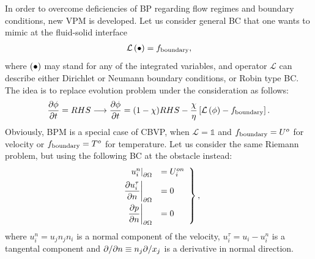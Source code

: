 In order to overcome deficiencies of BP regarding flow regimes and boundary conditions, new VPM is developed. Let us consider general BC that one wants to mimic at the fluid-solid interface
\begin{align}
\mathcal L \left(\bullet\right) = f_{\textmd{boundary}},
\end{align}
where $\left(\bullet\right)$ may stand for any of the integrated variables, and operator $\mathcal L$ can describe either Dirichlet or Neumann boundary conditions, or Robin type BC. The idea is to replace evolution problem under the consideration as follows:
\begin{align}
\frac {\partial \phi}{\partial t} = RHS \longrightarrow \frac {\partial \phi}{\partial t} = (1-\chi)RHS - \frac \chi \eta \left[\mathcal L \left(\phi\right) - f_{\textmd{boundary}}\right]. \label{eq:CBVP}
\end{align}
Obviously, BPM is a special case of CBVP, when $\mathcal L = \mathds 1$ and $f_{\textmd{boundary}} = U^o$ for velocity or $f_{\textmd{boundary}} = T^o$ for temperature. Let us consider the same Riemann problem, but using the following BC at the obstacle instead:
\begin{align}
\left.\begin{array}{rl}
\left.u_i^n\right|_{\partial \Omega} &= U_i^{on} \\ [1ex]
\displaystyle \left.\frac {\partial u_i^\tau}{\partial n}\right|_{\partial \Omega} &= 0 \\ [2ex]
\displaystyle \left.\frac {\partial p}{\partial n}\right|_{\partial \Omega} &= 0
\end{array}\right\},
\end{align}
where $u^n_i = u_j n_j n_i$ is a normal component of the velocity, $u_i^\tau = u_i - u_i^n$ is a tangental component and $\partial / \partial n \equiv n_j \partial / x_j$ is a derivative in normal direction.

